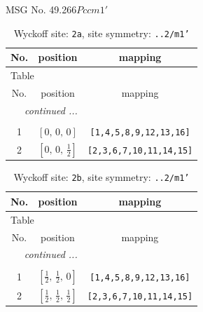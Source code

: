 \documentclass[fleqn,8pt]{jsarticle}
\begin{document}
\setcounter{MaxMatrixCols}{32}

\renewcommand{\tablename}{Table~}
\renewcommand{\figurename}{Figure~}
\begin{center}
\LARGE
MSG No. 49.266\quad$Pccm1'$
\end{center}
\renewcommand{\arraystretch}{1.2}
\begin{longtable}{ccc}
\caption{Wyckoff site: {\tt 2a}, site symmetry: {\tt ..2/m1'}}
 \\
 \hline \hline
No. & position & mapping \\ \hline \endfirsthead

\multicolumn{2}{l}{\tablename\ \thetable{}} \\
 \hline \hline
No. & position & mapping \\ \hline \endhead

 \hline \hline
\multicolumn{2}{r}{\footnotesize\it continued ...} \\ \endfoot

 \hline \hline
\multicolumn{2}{r}{} \\ \endlastfoot

1 & $\left[ 0,\, 0,\, 0 \right]$ & {\tt [1,4,5,8,9,12,13,16]} \\ \hline
2 & $\left[ 0,\, 0,\, \frac{1}{2} \right]$ & {\tt [2,3,6,7,10,11,14,15]} \\
\end{longtable}
\renewcommand{\arraystretch}{1.2}
\begin{longtable}{ccc}
\caption{Wyckoff site: {\tt 2b}, site symmetry: {\tt ..2/m1'}}
 \\
 \hline \hline
No. & position & mapping \\ \hline \endfirsthead

\multicolumn{2}{l}{\tablename\ \thetable{}} \\
 \hline \hline
No. & position & mapping \\ \hline \endhead

 \hline \hline
\multicolumn{2}{r}{\footnotesize\it continued ...} \\ \endfoot

 \hline \hline
\multicolumn{2}{r}{} \\ \endlastfoot

1 & $\left[ \frac{1}{2},\, \frac{1}{2},\, 0 \right]$ & {\tt [1,4,5,8,9,12,13,16]} \\ \hline
2 & $\left[ \frac{1}{2},\, \frac{1}{2},\, \frac{1}{2} \right]$ & {\tt [2,3,6,7,10,11,14,15]} \\
\end{longtable}
\end{document}
